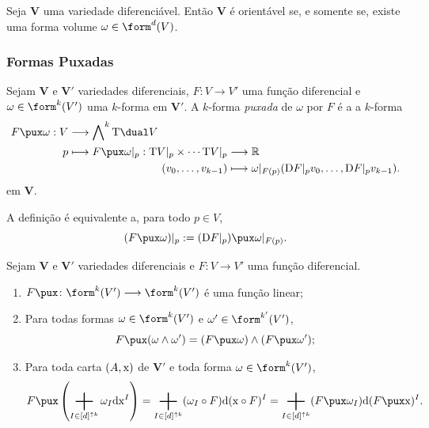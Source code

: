 \begin{prop}
Seja $\bm V$ uma variedade diferenciável. Então $\bm V$ é orientável se, e somente se, existe uma forma volume $\omega \in \form^d (V)$.
\end{prop}

\subsubsection{Formas Puxadas}

\begin{defi}
Sejam $\bm V$ e $\bm V'$ variedades diferenciais, $F\colon V \to V'$ uma função diferencial e $\omega \in \form^k (V')$ uma $k$-forma em $\bm V'$. A $k$-forma \emph{puxada} de $\omega$ por $F$ é a a $k$-forma
	\begin{align*}
	\func{F\pux \omega}{V}{\bigwedge\nolimits^k \Tg\dual V}{p}{
	\begin{aligned}[t]
	\func{F\pux \omega|_p}{\Tg V|_p \times \cdots \Tg V|_p}{\R}{(v_0,\ldots,v_{k-1})}{\omega|_{F(p)}(\D F|_p v_0,\ldots,\D F|_p v_{k-1}).}
	\end{aligned}
	}
	\end{align*}
em $\bm V$.
\end{defi}

A definição  é equivalente a, para todo $p \in V$,
	\begin{equation*}
	(F\pux \omega)|_p := (\D F|_p)\pux \omega|_{F(p)}.
	\end{equation*}

\begin{prop}
Sejam $\bm V$ e $\bm V'$ variedades diferenciais e $F\colon V \to V'$ uma função diferencial.
	\begin{enumerate}
	\item $F\pux\colon \form^k (V') \to \form^k(V')$ é uma função linear;
	\item Para todas formas $\omega \in \form^k(V')$ e $\omega' \in \form^{k'} (V')$,
		\begin{equation*}
		F\pux(\omega \wedge \omega') = (F\pux\omega) \wedge (F\pux\omega');
		\end{equation*}
	\item Para toda carta $(A,\mathrm{x})$ de $\bm V'$ e toda forma $\omega \in \form^k (V')$,
		\begin{equation*}
		F\pux \left( \sum_{I \in [d]^{\uparrow k}} \omega_I \dd\x^{I}\right) = \sum_{I \in [d]^{\uparrow k}} (\omega_I \circ F) \dd(\x \circ F)^{I} = \sum_{I \in [d]^{\uparrow k}} (F\pux\omega_I) \dd(F\pux\x)^{I}.
		\end{equation*}
	\end{enumerate}
\end{prop}

